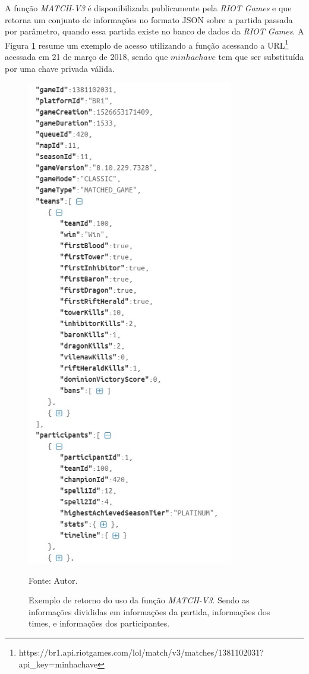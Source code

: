 A função \textit{MATCH-V3} é disponibilizada publicamente pela \textit{RIOT Games} e que retorna um conjunto de informações no formato JSON sobre a partida passada por parâmetro, quando essa partida existe no banco de dados da \textit{RIOT Games}. A Figura \ref{fig:match-v3} resume um exemplo de acesso utilizando a função acessando a URL\footnote{https://br1.api.riotgames.com/lol/match/v3/matches/1381102031?api\_key=minhachave} acessada em 21 de março de 2018, sendo que \(minhachave\) tem que ser substituída por uma chave privada válida.
\begin{figure}[H]
	\caption{Exemplo de retorno do uso da função \textit{MATCH-V3}. Sendo as informações divididas em informações da partida, informações dos times, e informações dos participantes.}
	\begin{center}
		\includegraphics[width=9cm]{imagens/match-v3.jpg}
	\end{center}
	\small{Fonte: Autor.}
	\label{fig:match-v3}
\end{figure}

